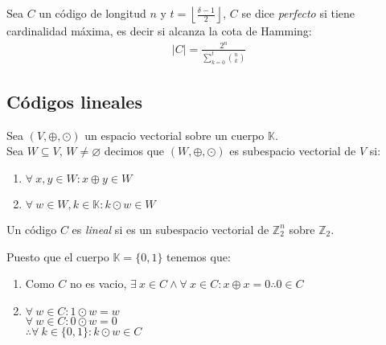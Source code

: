 \begin{definition}
Sea $C$ un código de longitud $n$ y $t = \left\lfloor{\frac{\delta - 1}{2}}\right\rfloor$, $C$ se dice \emph{perfecto} si tiene cardinalidad máxima, es decir si alcanza la cota de Hamming:
\begin{align}
|C| = \frac{\displaystyle{2^n}}{\displaystyle\sum\limits_{k=0}^t {\displaystyle\binom{n}{k}}}
\end{align}
\end{definition}

\subsection{Códigos lineales}

\begin{definition}
Sea $(V, \oplus, \odot)$ un espacio vectorial sobre un cuerpo $\mathbb{K}$.\\
Sea $W \subseteq V$, $W \neq \varnothing$ decimos que $(W, \oplus, \odot)$ es subespacio vectorial de $V$ si:
\begin{enumerate}
\item $\forall~ x, y \in W : x \oplus y \in W$
\item $\forall~ w \in W, k \in \mathbb{K} : k\odot w \in W$
\end{enumerate}
\end{definition}
\begin{definition}
Un código $C$ es \emph{lineal} si es un subespacio vectorial de ${\mathbb{Z}_2^n}$ sobre $\mathbb{Z}_2$.
\end{definition}
Puesto que el cuerpo $\mathbb{K} = \{0,1\}$ tenemos que:
\begin{enumerate}
\item Como $C$ no es vacio, $\exists~ x \in C \wedge \forall~ x \in C: x \oplus x = 0 \therefore 0 \in C$
\item $\forall~ w \in C: 1\odot w = w$ \\
$\forall~ w \in C: 0 \odot w = 0$\\
$\therefore \forall~ k \in \{0,1\} : k \odot w \in C$
\end{enumerate}

